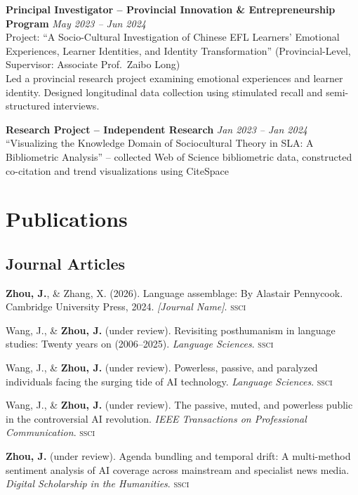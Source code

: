 \documentclass[10pt,a4paper]{article}
\newcommand{\cventry}[4]{
  \textbf{#1} \hfill \textit{\footnotesize #2} \\
  \footnotesize #3 \\
  \footnotesize #4
  \vspace{0.15em}
}
\newcommand{\pubentry}[1]{
  \footnotesize #1
}
\begin{document}
\cventry{Principal Investigator -- Provincial Innovation \& Entrepreneurship Program}{May 2023 -- Jun 2024}
  {Project: ``A Socio-Cultural Investigation of Chinese EFL Learners' Emotional Experiences, Learner Identities, and Identity Transformation'' (Provincial-Level, Supervisor: Associate Prof.\ Zaibo Long)}
  {Led a provincial research project examining emotional experiences and learner identity. Designed longitudinal data collection using stimulated recall and semi-structured interviews.}

\cventry{Research Project -- Independent Research}{Jan 2023 -- Jan 2024}
  {``Visualizing the Knowledge Domain of Sociocultural Theory in SLA: A Bibliometric Analysis'' -- collected Web of Science bibliometric data, constructed co-citation and trend visualizations using CiteSpace}
  {}

\section{Publications}

\subsection*{\normalsize Journal Articles}

\pubentry{
  \textbf{Zhou, J.}, \& Zhang, X. (2026). Language assemblage: By Alastair Pennycook. Cambridge University Press, 2024. \textit{[Journal Name]}. \hfill \textsc{ssci}
}

\pubentry{
  Wang, J., \& \textbf{Zhou, J.} (under review). Revisiting posthumanism in language studies: Twenty years on (2006--2025). \textit{Language Sciences}. \hfill \textsc{ssci}
}

\pubentry{
  Wang, J., \& \textbf{Zhou, J.} (under review). Powerless, passive, and paralyzed individuals facing the surging tide of AI technology. \textit{Language Sciences}. \hfill \textsc{ssci}
}

\pubentry{
  Wang, J., \& \textbf{Zhou, J.} (under review). The passive, muted, and powerless public in the controversial AI revolution. \textit{IEEE Transactions on Professional Communication}. \hfill \textsc{ssci}
}

\pubentry{
  \textbf{Zhou, J.} (under review). Agenda bundling and temporal drift: A multi-method sentiment analysis of AI coverage across mainstream and specialist news media. \textit{Digital Scholarship in the Humanities}. \hfill \textsc{ssci}
}
\end{document}
